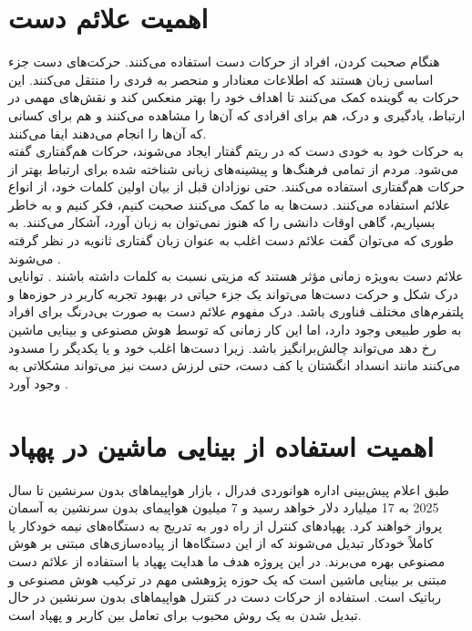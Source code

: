  \section{اهمیت علائم دست}
 هنگام صحبت کردن، افراد از حرکات دست استفاده می‌کنند. حرکت‌های دست جزء اساسی زبان هستند که اطلاعات معنادار و منحصر به فردی را منتقل می‌کنند. این حرکات به گوینده کمک می‌کنند تا اهداف خود
  را بهتر منعکس کند و نقش‌های مهمی در ارتباط، یادگیری و درک، هم برای افرادی که آن‌ها را مشاهده می‌کنند و هم برای کسانی که آن‌ها را انجام می‌دهند ایفا می‌کنند.
 \\
 به حرکات خود به خودی دست که در ریتم گفتار ایجاد می‌شوند، حرکات هم‌گفتاری  گفته می‌شود. مردم از تمامی فرهنگ‌ها و پیشینه‌های زبانی شناخته شده برای ارتباط بهتر از حرکات هم‌گفتاری استفاده می‌کنند. حتی نوزادان قبل از بیان اولین کلمات خود، از انواع علائم استفاده می‌کنند. دست‌ها به ما کمک می‌کنند صحبت کنیم، فکر کنیم و به خاطر بسپاریم، گاهی اوقات دانشی را که هنوز
  نمی‌توان به زبان آورد، آشکار می‌کنند. به طوری که می‌توان گفت علائم دست اغلب به عنوان زبان گفتاری ثانویه در نظر گرفته می‌شوند \cite{clough2020role}.
 \\
 علائم دست به‌ویژه زمانی مؤثر هستند که مزیتی نسبت به کلمات داشته باشند \cite{kang2016hands}. توانایی درک شکل و حرکت دست‌ها می‌تواند یک
  جزء حیاتی در بهبود تجربه کاربر  در حوزه‌ها و پلتفرم‌های مختلف فناوری باشد. درک مفهوم علائم دست به صورت بی‌درنگ برای افراد به طور طبیعی وجود دارد، اما این کار زمانی که توسط هوش مصنوعی و بینایی ماشین رخ دهد می‌تواند چالش‌برانگیز باشد. زیرا
 دست‌ها اغلب خود و یا یکدیگر را مسدود می‌کنند مانند انسداد انگشتان یا کف دست، حتی لرزش دست نیز می‌تواند مشکلاتی به وجود آورد \cite{zhang2020mediapipe}.
 

 
 \section{اهمیت استفاده از بینایی ماشین در پهپاد}
 طبق اعلام پیش‌بینی اداره هوانوردی فدرال
 ، بازار هواپیماهای بدون سرنشین تا سال 2025 به 17 میلیارد دلار خواهد رسید و 7 میلیون هواپیمای بدون سرنشین به آسمان پرواز خواهند‌ کرد. پهپادهای کنترل
 از راه دور به تدریج به دستگاه‌های نیمه خودکار یا کاملاً خودکار تبدیل می‌شوند که از این دستگاه‌‌ها از پیاده‌سازی‌های مبتنی بر هوش مصنوعی بهره می‌برند. 
 در این پروژه هدف ما هدایت پهپاد با استفاده از علائم دست مبتنی بر بینایی ماشین است که یک حوزه پژوهشی مهم در ترکیب هوش مصنوعی و رباتیک است. 
 استفاده از حرکات دست در کنترل هواپیماهای بدون سرنشین در حال تبدیل شدن به یک روش محبوب برای تعامل بین کاربر و پهپاد است. 
 

